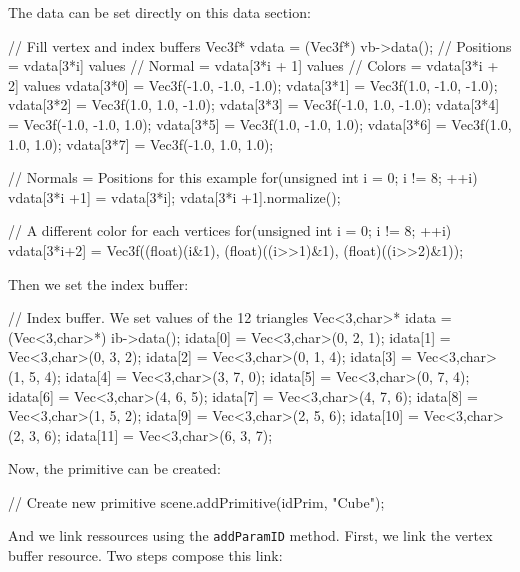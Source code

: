 \documentclass[a4paper,12pt,titlepage]{article}
\begin{document}
The data can be set directly on this data section:

\begin{codeflowvr_cpp}
    // Fill vertex and index buffers 
    Vec3f* vdata = (Vec3f*) vb->data();
    // Positions = vdata[3*i] values
    // Normal = vdata[3*i + 1] values
    // Colors = vdata[3*i + 2] values
    vdata[3*0] = Vec3f(-1.0, -1.0, -1.0); 
    vdata[3*1] = Vec3f(1.0, -1.0, -1.0); 
    vdata[3*2] = Vec3f(1.0, 1.0, -1.0); 
    vdata[3*3] = Vec3f(-1.0, 1.0, -1.0); 
    vdata[3*4] = Vec3f(-1.0, -1.0, 1.0); 
    vdata[3*5] = Vec3f(1.0, -1.0, 1.0); 
    vdata[3*6] = Vec3f(1.0, 1.0, 1.0); 
    vdata[3*7] = Vec3f(-1.0, 1.0, 1.0); 

    // Normals = Positions for this example
    for(unsigned int i = 0; i != 8; ++i)
    {
    	vdata[3*i +1] = vdata[3*i];
    	vdata[3*i +1].normalize();
    }

    // A different color for each vertices
    for(unsigned int i = 0; i != 8; ++i)
    {
    	vdata[3*i+2] = Vec3f((float)(i&1), (float)((i>>1)&1), (float)((i>>2)&1));
    }
\end{codeflowvr_cpp} \par

Then we set the index buffer:

\begin{codeflowvr_cpp}

    // Index buffer. We set values of the 12 triangles
    Vec<3,char>* idata = (Vec<3,char>*) ib->data();
    idata[0] = Vec<3,char>(0, 2, 1); 
    idata[1] = Vec<3,char>(0, 3, 2); 
    idata[2] = Vec<3,char>(0, 1, 4); 
    idata[3] = Vec<3,char>(1, 5, 4); 
    idata[4] = Vec<3,char>(3, 7, 0); 
    idata[5] = Vec<3,char>(0, 7, 4); 
    idata[6] = Vec<3,char>(4, 6, 5); 
    idata[7] = Vec<3,char>(4, 7, 6); 
    idata[8] = Vec<3,char>(1, 5, 2); 
    idata[9] = Vec<3,char>(2, 5, 6); 
    idata[10] = Vec<3,char>(2, 3, 6); 
    idata[11] = Vec<3,char>(6, 3, 7); 
\end{codeflowvr_cpp} \par

Now, the primitive can be created:

\begin{codeflowvr_cpp}
    // Create new primitive
    scene.addPrimitive(idPrim, "Cube");
\end{codeflowvr_cpp} \par

And we link ressources using the \texttt{addParamID} method. First, we link the vertex buffer resource. Two steps compose this link:
\end{document}
